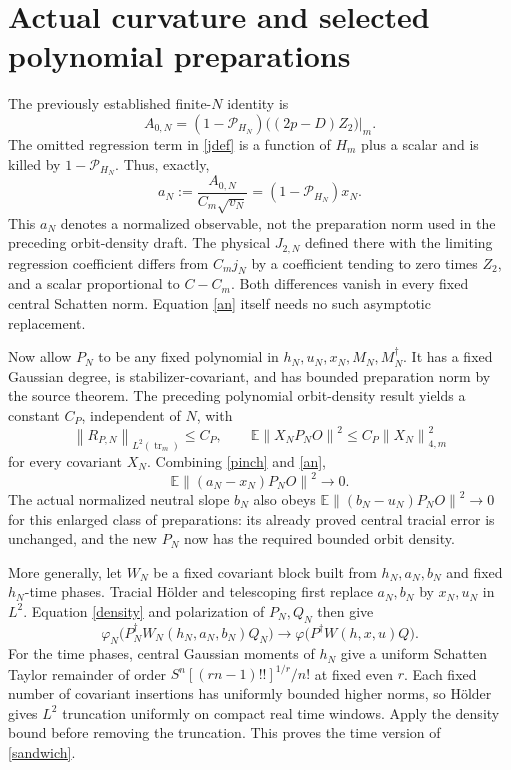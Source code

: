 \documentclass[11pt]{article}
\newcommand{\E}{\mathbb E}
\newcommand{\tr}{\operatorname{tr}}
\newcommand{\norm}[1]{\left\lVert#1\right\rVert}
\begin{document}
\section{Actual curvature and selected polynomial preparations}
The previously established finite-$N$ identity is
\begin{equation}\label{actual}
 A_{0,N}=(1-\mathcal P_{H_N})\bigl((2p-D)Z_2\bigr)\big|_m.
\end{equation}
The omitted regression term in \eqref{jdef} is a function of $H_m$
plus a scalar and is killed by $1-\mathcal P_{H_N}$. Thus, exactly,
\begin{equation}\label{an}
 a_N:=\frac{A_{0,N}}{C_m\sqrt{v_N}}
       =(1-\mathcal P_{H_N})x_N.
\end{equation}
This $a_N$ denotes a normalized observable, not the preparation norm
used in the preceding orbit-density draft. The physical $J_{2,N}$
defined there with the limiting regression coefficient differs from
$C_mj_N$ by a coefficient tending to zero times $Z_2$, and a scalar
proportional to $C-C_m$. Both differences vanish in every fixed
central Schatten norm. Equation \eqref{an} itself needs no such
asymptotic replacement.

Now allow $P_N$ to be any fixed polynomial in
$h_N,u_N,x_N,M_N,M_N^\dagger$. It has a fixed Gaussian degree,
is stabilizer-covariant, and has bounded preparation norm by the
source theorem. The preceding polynomial orbit-density result yields
a constant $C_P$, independent of $N$, with
\begin{equation}\label{density}
 \norm{R_{P,N}}_{L^2(\tr_m)}\le C_P,\qquad
 \E\norm{X_NP_NO}^2\le C_P\norm{X_N}_{4,m}^2
\end{equation}
for every covariant $X_N$. Combining \eqref{pinch} and \eqref{an},
\begin{equation}\label{selectedpinch}
 \E\norm{(a_N-x_N)P_NO}^2\longrightarrow0.
\end{equation}
The actual normalized neutral slope $b_N$ also obeys
$\E\norm{(b_N-u_N)P_NO}^2\to0$ for this enlarged class of preparations:
its already proved central tracial error is unchanged, and the
new $P_N$ now has the required bounded orbit density.

More generally, let $W_N$ be a fixed covariant block built from
$h_N,a_N,b_N$ and fixed $h_N$-time phases. Tracial H\"older and
telescoping first replace $a_N,b_N$ by $x_N,u_N$ in $L^2$.
Equation \eqref{density} and polarization of $P_N,Q_N$ then give
\begin{equation}\label{sandwich}
 \varphi_N\bigl(P_N^\dagger W_N(h_N,a_N,b_N)Q_N\bigr)
 \longrightarrow\varphi\bigl(P^\dagger W(h,x,u)Q\bigr).
\end{equation}
For the time phases, central Gaussian moments of $h_N$ give a
uniform Schatten Taylor remainder of order
$S^n[(rn-1)!!]^{1/r}/n!$ at fixed even $r$.
Each fixed number of covariant insertions has uniformly bounded higher
norms, so H\"older gives $L^2$ truncation uniformly on compact real
time windows. Apply the density bound before removing the truncation.
This proves the time version of \eqref{sandwich}.
\end{document}
